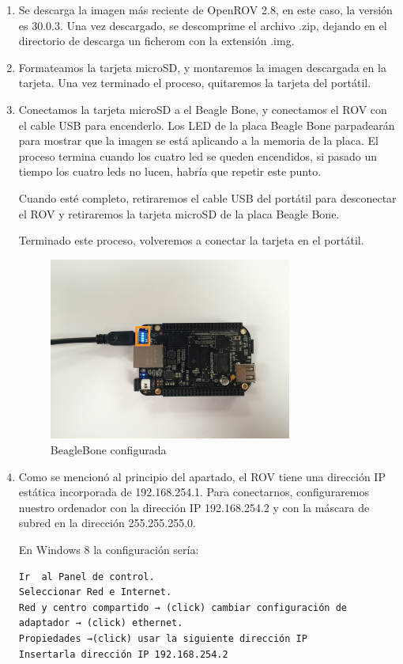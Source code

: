 \begin{enumerate}
\item Se descarga la imagen más reciente de OpenROV 2.8, en este caso, la versión es 30.0.3. Una vez descargado, se descomprime el archivo .zip, dejando en el directorio de descarga un ficherom con la extensión .img.
\item Formateamos la tarjeta microSD, y montaremos la imagen descargada en la tarjeta. Una vez terminado el proceso, quitaremos la tarjeta del portátil.
\item Conectamos la tarjeta microSD a el Beagle Bone, y conectamos el ROV con el cable USB para encenderlo. Los LED de la placa Beagle Bone parpadearán para mostrar que la imagen se está aplicando a la memoria de la placa. El proceso termina cuando los cuatro led se queden encendidos, si pasado un tiempo los cuatro leds no lucen, habría que repetir este punto.

Cuando esté completo, retiraremos el cable USB del portátil para desconectar el ROV y retiraremos la tarjeta microSD de la placa Beagle Bone.

Terminado este proceso, volveremos a conectar la tarjeta en el portátil.
\newpage
\begin{figure} [hbtp]
\begin{center}
  \includegraphics[width=8cm]{img/cap3/3_4/BBB}
\end{center}
\caption{BeagleBone configurada}
\label{fig:bbb}
\end{figure}
\item Como se mencionó al principio del apartado, el ROV tiene una dirección IP estática incorporada de 192.168.254.1. Para conectarnos, configuraremos nuestro ordenador con la dirección IP 192.168.254.2 y con la máscara de subred en la dirección 255.255.255.0.

En Windows 8 la configuración sería:

\renewcommand{\lstlistingname}{Configuración}
\begin{lstlisting}[caption= Windows 8, label={lst:config_w8}]
Ir  al Panel de control.
Seleccionar Red e Internet.
Red y centro compartido → (click) cambiar configuración de adaptador → (click) ethernet.
Propiedades →(click) usar la siguiente dirección IP
Insertarla dirección IP 192.168.254.2
\end{lstlisting}


\end{enumerate}
